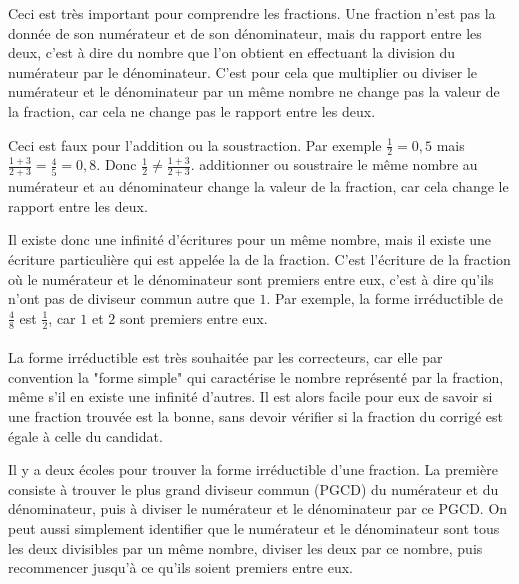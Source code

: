 \documentclass[12pt]{article}
\begin{document}
\begin{remarque}{}{}
    Ceci est très important pour comprendre les fractions. Une fraction n'est pas la donnée de son numérateur et de son dénominateur, mais du rapport entre les deux, c'est à dire du nombre que l'on obtient en effectuant la division du numérateur par le dénominateur. C'est pour cela que multiplier ou diviser le numérateur et le dénominateur par un même nombre ne change pas la valeur de la fraction, car cela ne change pas le rapport entre les deux.
\end{remarque}

\begin{remarque}{}{}
    Ceci est faux pour l'addition ou la soustraction. Par exemple $\frac{1}{2} = 0,5$ mais $\frac{1+3}{2+3} = \frac{4}{5} = 0,8$. Donc $\frac{1}{2} \neq \frac{1+3}{2+3}$. additionner ou soustraire le même nombre au numérateur et au dénominateur change la valeur de la fraction, car cela change le rapport entre les deux.
\end{remarque}

Il existe donc une infinité d'écritures pour un même nombre, mais il existe une écriture particulière qui est appelée la  de la fraction. C'est l'écriture de la fraction où le numérateur et le dénominateur sont premiers entre eux, c'est à dire qu'ils n'ont pas de diviseur commun autre que $1$. Par exemple, la forme irréductible de $\frac{4}{8}$ est $\frac{1}{2}$, car $1$ et $2$ sont premiers entre eux.\\\\
La forme irréductible est très souhaitée par les correcteurs, car elle par convention la "forme simple" qui caractérise le nombre représenté par la fraction, même s'il en existe une infinité d'autres. Il est alors facile pour eux de savoir si une fraction trouvée est la bonne, sans devoir vérifier si la fraction du corrigé est égale à celle du candidat.

\begin{remarque}{}{}
    Il y a deux écoles pour trouver la forme irréductible d'une fraction. La première consiste à trouver le plus grand diviseur commun (PGCD) du numérateur et du dénominateur, puis à diviser le numérateur et le dénominateur par ce PGCD. On peut aussi simplement identifier que le numérateur et le dénominateur sont tous les deux divisibles par un même nombre, diviser les deux par ce nombre, puis recommencer jusqu'à ce qu'ils soient premiers entre eux.
\end{remarque}
\end{document}
